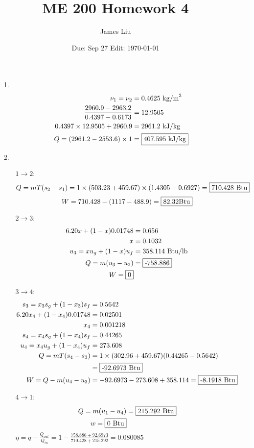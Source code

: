 \documentclass{article}
\date{Due: Sep 27  Edit: \today}
\title{ME 200 Homework 4}
\author{James Liu}
\begin{document}
\maketitle
\begin{itemize}
    \item [1.] \begin{align*}
        \nu_1 = \nu_2 &= 0.4625 \text{ kg/m}^3\\
        \frac{2960.9-2963.2}{0.4397-0.6173}&=12.9505\\
        0.4397\times 12.9505+2960.9&=2961.2 \text{ kJ/kg}\\
        Q = (2961.2 - 2553.6 )\times 1 &= \fbox{\(407.595 \text{ kJ/kg}\)}
    \end{align*}

    \item [2.]\ 
    \begin{itemize}
        \item [\(1\rightarrow 2\):] \[Q = mT(s_2-s_1) = 1\times (503.23+459.67)\times(1.4305-0.6927) = \fbox{\(710.428 \text{ Btu}\)}\]
                                    \[W = 710.428-(1117-488.9)=\fbox{\(82.32 \text{Btu}\)}\]
        \item [\(2\rightarrow 3\):] \begin{align*}
            6.20x+(1-x)0.01748 &=0.656\\
            x &=0.1032\\
            u_3 = xu_g+(1-x)u_f &= 358.114 \text{ Btu/lb}\\
            Q = m(u_3-u_2) &= \fbox{-758.886}\\
            W = \fbox{0}
        \end{align*}
        \item [\(3\rightarrow 4\):]
        \begin{align*}
            s_3 = x_3s_g+(1-x_3)s_f &= 0.5642\\
            6.20x_4+(1-x_4)0.01748 &=0.02501\\
            x_4&=0.001218\\
            s_4 = x_4s_g+(1-x_4)s_f &=0.44265\\
            u_4 = x_4u_g +(1-x_4)u_f&=273.608\\
            Q = mT(s_4-s_3) &= 1\times (302.96+459.67)(0.44265-0.5642)\\
            &=\fbox{-92.6973 Btu}\\
            W = Q-m(u_4-u_3)&=-92.6973 -273.608+358.114 = \fbox{-8.1918 Btu}
        \end{align*}
        \item [\(4\rightarrow 1\):] \begin{align*}
            Q = m(u_1-u_4) & = \fbox{215.292 Btu}\\
            w = \fbox{0 Btu}
        \end{align*}
        \(\displaystyle \eta = q-\frac{Q_{out}}{Q_{in}} = 1-\frac{758.886+92.6973}{710.428+215.292}=0.080085\)


\end{itemize}
\end{itemize}
\end{document}
